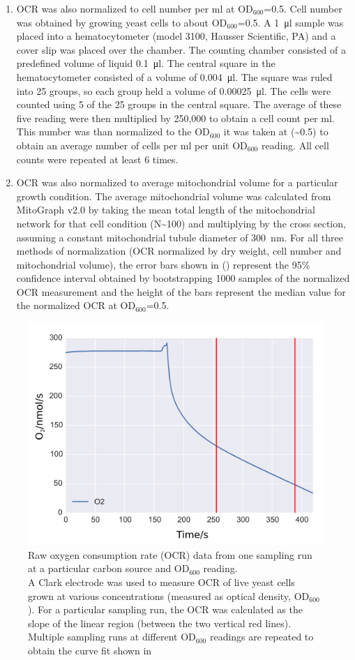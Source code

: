 \begin{enumerate}[label=\arabic*), leftmargin=*, itemindent=0pc]
\item OCR was also normalized to cell number per ml at OD$_{600}$=0.5. Cell number was obtained by growing yeast cells to about OD$_{600}$=0.5. A \SI{1}{\ul} sample was placed into a hematocytometer (model 3100, Hausser Scientific, PA) and a cover slip was placed over the chamber. The counting chamber consisted of a predefined volume of liquid \SI{.1}{\ul}. The central square in the hematocytometer consisted of a volume of \SI{.004}{\ul}. The square was ruled into 25 groups, so each group held a volume of \SI{.00025}{\ul}. The cells were counted using 5 of the 25 groups in the central square. The average of these five reading were then multiplied by 250,000 to obtain a cell count per ml. This number was than normalized to the OD$_{600}$ it was taken at (\textasciitilde0.5) to obtain an average number of cells per ml per unit OD$_{600}$ reading. All cell counts were repeated at least 6 times.
\item OCR was also normalized to average mitochondrial volume for a particular growth condition. The average mitochondrial volume was calculated from MitoGraph v2.0 by taking the mean total length of the mitochondrial network for that cell condition (N\textasciitilde100) and multiplying by the cross section, assuming a constant mitochondrial tubule diameter of \SI{300}{\nm}. For all three methods of normalization (OCR normalized by dry weight, cell number and mitochondrial volume), the error bars shown in () represent the 95\% confidence interval obtained by bootstrapping 1000 samples of the normalized OCR measurement and the height of the bars represent the median value for the normalized OCR at OD$_{600}$=0.5.
\end{enumerate}
%
\begin{figure}[htp]
	\centering
    \includegraphics[width=.65\textwidth]{linear}
    \caption[Raw oxygen consumption rate (OCR) data from one sampling run at a particular carbon source and OD$_{600}$ reading.]{Raw oxygen consumption rate (OCR) data from one sampling run at a particular carbon source and OD$_{600}$ reading.\\A Clark electrode was used to measure OCR of live yeast cells grown at various concentrations (measured as optical density, OD$_{600}$). For a particular sampling run, the OCR was calculated as the slope of the linear region (between the two vertical red lines). Multiple sampling runs at different OD$_{600}$ readings are repeated to obtain the curve fit shown in }\label{fig:linear}
\end{figure}
